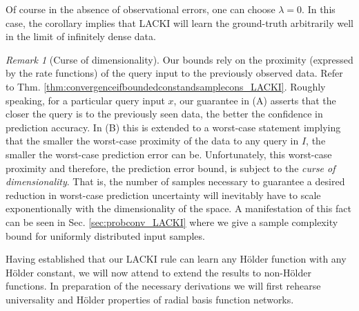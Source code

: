 \documentclass{article} %
\theoremstyle{definition}
\theoremstyle{remark}
\newtheorem{remark}[thm]{Remark}
\newcommand{\nat}{\mathbb N}
\newcommand{\outspace}{\ensuremath{ \mathcal Y}}
\newcommand{\grid}{\ensuremath{  G}}
\newcommand{\metric}{\, \mathfrak{d}} %
\newcommand{\predfn}{\, \mathfrak{  \hat f_n}} %
\newcommand{\hexp}{{ \alpha }}%
\newcommand{\hestthresh}{\ensuremath{ \lambda}}
\newcommand{\obserr}{\mathfrak e} %
\newcommand{\obserrbnd}{\bar{\mathfrak e}}
\newcommand{\seq}[2]{\ensuremath{\bigl(#1\bigr)_{#2}}}
\begin{document}
%
%
%

Of course in the absence of observational errors, one can choose $\hestthresh = 0$. In this case, the corollary implies that LACKI will learn the ground-truth arbitrarily well in the limit of infinitely dense data.

\begin{remark} [Curse of dimensionality]
Our bounds rely on the proximity (expressed by the rate functions) of the query input to the previously observed data.
Refer to Thm. \ref{thm:convergenceifboundedconstandsamplecons_LACKI}.
Roughly speaking, for a particular query input $x$, our guarantee in (A) asserts that the closer the query is to the previously seen data, the better the confidence in prediction accuracy. In (B) this is extended to a worst-case statement implying that the smaller the worst-case proximity of the data to any query in $I$, the smaller the worst-case prediction error can be. 
Unfortunately, this worst-case proximity and therefore, the prediction error bound, is subject to the \emph{curse of dimensionality}. That is, the number of samples necessary to guarantee a desired reduction in worst-case prediction uncertainty will inevitably have to scale exponentionally with the dimensionality of the space. A manifestation of this fact can be seen in Sec. \ref{sec:probconv_LACKI} where we give a sample complexity bound for uniformly distributed input samples. 
\end{remark}


Having established that our LACKI rule can learn any H\"older function with any H\"older constant, we will now attend to extend the results to non-H\"older functions. In preparation of the necessary derivations we will first rehearse universality and H\"older properties of radial basis function networks. 
\end{document}

